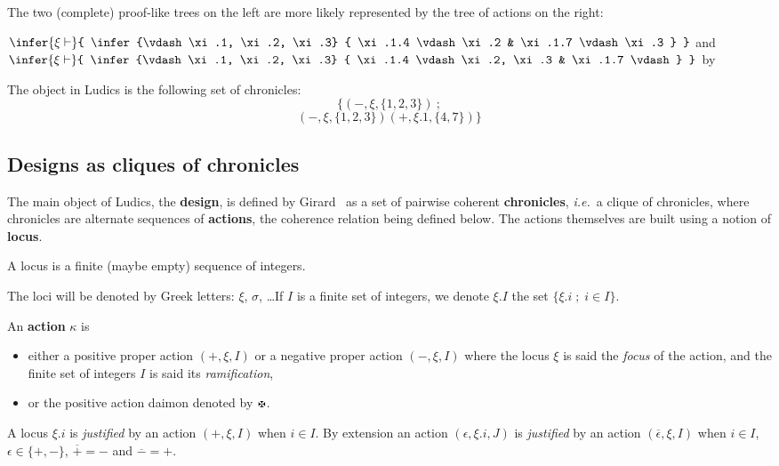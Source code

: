 \documentclass{LMCS}
\def\ie{{\em i.e.}}
\begin{document}
\begin{exa}
The two (complete) proof-like trees on the left are more likely represented by the tree of  actions on the right:
\begin{center}
$
\infer{\xi\vdash}
	{
	\infer{\vdash \xi.1, \xi.2, \xi.3}
		{
		\xi.1.4 \vdash \xi.2
		&
		\xi.1.7 \vdash \xi.3
		}
	}
$
and
$
\infer{\xi\vdash}
	{
	\infer{\vdash \xi.1, \xi.2, \xi.3}
		{
		\xi.1.4 \vdash \xi.2, \xi.3
		&
		\xi.1.7 \vdash
		}
	}
$
\hspace{.3cm}by\hspace{.3cm}
\end{center}
The object in Ludics is the following set of chronicles:
$$
\{(-,\xi,\{1,2,3\}) ~;
$$
$$
(-,\xi,\{1,2,3\})(+,\xi.1,\{4,7\})\}
$$
\label{dessin}
\end{exa}


\subsection{Designs as cliques of chronicles}
 The main object of Ludics, the {\bf design}, is defined by Girard~\cite{DBLP:journals/mscs/Girard01} as a set of pairwise coherent {\bf chronicles}, \ie\ a clique of chronicles, where chronicles are alternate sequences of {\bf actions}, the coherence relation being defined below. The actions themselves are built using a notion of {\bf locus}.
 
  \begin{defi}[Locus]
 A locus is a finite (maybe empty) sequence of integers.
  \end{defi}
 The loci  will be denoted by Greek letters: $\xi$, $\sigma$, \dots If $I$ is a finite set of integers, we denote $\xi.I$ the set $\{ \xi.i\;;\;i\in I\}$. 

 \begin{defi}[Action]
An {\bf action} $\kappa$ is
\begin{itemize}
\item either a positive proper action $(+,\xi,I)$ or a negative proper action $(-,\xi,I)$ where the locus $\xi$ is said the {\em focus} of the action, and the finite set of integers $I$ is said its {\em ramification},

\item or the positive action daimon denoted by $\daimon$.
\end{itemize}
 A locus $\xi.i$ is {\em justified} by an action $(+,\xi,I)$ when $i \in I$. By extension an action $(\epsilon,\xi.i,J)$ is {\em justified} by an action $(\overline{\epsilon},\xi,I)$ when $i \in I$, $\epsilon \in \{+,-\}$, $\overline{+} = -$ and $\overline{-} = +$. 
\end{defi}
\end{document}
